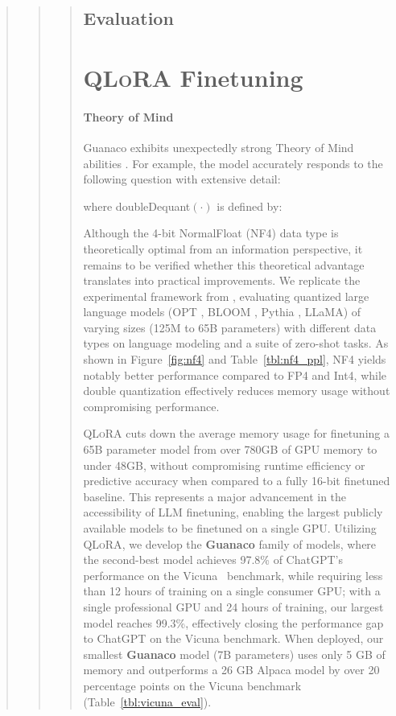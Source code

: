 \begin{quote}
\begin{quote}
\begin{quote}
\subsection{Evaluation}

\section{\textsc{QLoRA} Finetuning}

\paragraph{Theory of Mind} {Guanaco} exhibits unexpectedly strong Theory of Mind abilities \cite{nematzadeh2018evaluating, sap2022neural}. For example, the model accurately responds to the following question with extensive detail:

where doubleDequant$(\cdot)$ is defined by:

Although the 4-bit NormalFloat (NF4) data type is theoretically optimal from an information perspective, it remains to be verified whether this theoretical advantage translates into practical improvements. We replicate the experimental framework from \citet{dettmers2022case}, evaluating quantized large language models (OPT \citep{zhang2022opt}, BLOOM \cite{scao2022bloom}, Pythia \cite{biderman2023pythia}, LLaMA) of varying sizes (125M to 65B parameters) with different data types on language modeling and a suite of zero-shot tasks. As shown in Figure~\ref{fig:nf4} and Table~\ref{tbl:nf4_ppl}, NF4 yields notably better performance compared to FP4 and Int4, while double quantization effectively reduces memory usage without compromising performance.

\textsc{QLoRA} cuts down the average memory usage for finetuning a 65B parameter model from over 780GB of GPU memory to under 48GB, without compromising runtime efficiency or predictive accuracy when compared to a fully 16-bit finetuned baseline. This represents a major advancement in the accessibility of LLM finetuning, enabling the largest publicly available models to be finetuned on a single GPU. Utilizing \textsc{QLoRA}, we develop the \textbf{Guanaco} family of models, where the second-best model achieves 97.8\% of ChatGPT’s performance on the Vicuna~\citep{vicuna2023} benchmark, while requiring less than 12 hours of training on a single consumer GPU; with a single professional GPU and 24 hours of training, our largest model reaches 99.3\%, effectively closing the performance gap to ChatGPT on the Vicuna benchmark. When deployed, our smallest \textbf{Guanaco} model (7B parameters) uses only 5 GB of memory and outperforms a 26 GB Alpaca model by over 20 percentage points on the Vicuna benchmark (Table~\ref{tbl:vicuna_eval}).


\end{quote}
\end{quote}
\end{quote}
